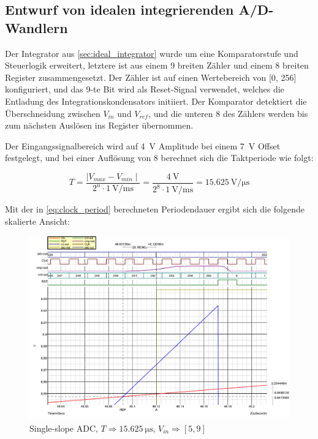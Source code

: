 \documentclass[
	ngerman,
	parskip=half,
	twocolumn,
	DIV=calc,
	]{scrartcl}
\begin{document}
		\subsection{Entwurf von idealen integrierenden A/D-Wandlern}
		
		\label{sec:single-slope-adc}		
	
		Der Integrator aus \cref{sec:ideal_integrator} wurde um eine Komparatorstufe und Steuerlogik erweitert, letztere ist aus einem \SI{9}{\bit} breiten Zähler und einem  \SI{8}{\bit} breiten Register zusammengesetzt. 
		Der Zähler ist auf einen Wertebereich von [0, 256] konfiguriert, und das 9-te Bit wird als Reset-Signal verwendet, welches die Entladung des Integrationskondensators initiiert.
		Der Komparator detektiert die Überschneidung zwischen $V_{in}$ und $V_{ref}$, und die unteren \SI{8}{\bit} des Zählers werden bis zum nächsten Auslösen ins Register übernommen.
		
		Der Eingangssignalbereich wird auf \SI{4}{\volt} Amplitude bei einem \SI{7}{\volt} Offset  festgelegt, und bei einer Auflösung von \SI{8}{\bit} berechnet sich die Taktperiode wie folgt: 
		
		\begin{equation}
		\label{eq:clock_period}
		T = \frac{\mid V_{max} - V_{min} \mid}{2^n  \cdot \SI{1}{\volt\per\milli\second}} = \frac{\SI{4}{\volt}}{2^8 \cdot \SI{1}{\volt\per\milli\second}} = \SI{15.625}{\volt\per\micro\second}	
		\end{equation}
				
		Mit der in \cref{eq:clock_period} berechneten Periodendauer ergibt sich die folgende skalierte Ansicht: 
		
		\begin{figure}[h!]
			\centering
			\includegraphics[width=\linewidth]{ideal_single_slope_odd_freq_comparator_slew_rate_wide}
			\caption[Single-slope ADC (T = \SI{15.625}{\micro\second})]{Single-slope ADC, $T \Rightarrow \SI{15.625}{\micro\second}$, $V_{in} \Rightarrow [5,  9]$}
			\label{fig:single-slope-ideal-slew-rate}
		\end{figure}	
	
\end{document}
